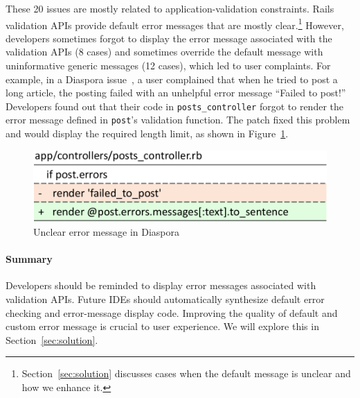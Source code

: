 These 20 issues are mostly related to application-validation constraints.
Rails validation APIs provide default error messages that are mostly 
clear.\footnote{Section~\ref{sec:solution} discusses cases when the default message is unclear
and how we enhance it.} However, developers 
sometimes forgot to display the error message associated with the validation
APIs (8 cases) and sometimes override the default message with
uninformative generic messages (12 cases), which led to user complaints.
For example,
in a Diaspora issue~\cite{diaspora-5090}, a user complained that when he tried to post a long article, the posting failed with an unhelpful error message ``Failed to post!'' 
Developers found out that their code in {\tt posts\_controller} forgot to render the error message
defined in {\tt post}'s validation function. The patch fixed this problem
and would display the required length limit,
as shown in Figure~\ref{fig:diaspora-5151-errormsg}.
\begin{figure}
    \centering
    \includegraphics[width=0.6\columnwidth]{constraints/figs/diaspora-5990-errormsg-cp.pdf}
    \caption{Unclear error message in Diaspora}
    \label{fig:diaspora-5151-errormsg}
\end{figure}

\paragraph{\bf Summary} Developers should be reminded to display error messages associated with validation APIs. Future IDEs should automatically 
synthesize default error checking and error-message display code. 
Improving the quality of default and custom error message is crucial to
user experience. We will explore this in Section~\ref{sec:solution}.
 

